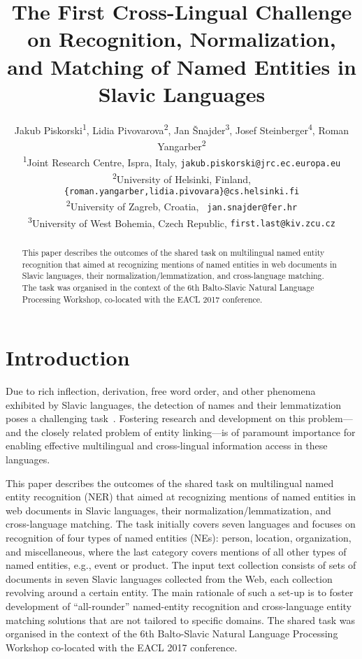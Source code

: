 \documentclass[11pt]{article}
\title{The First Cross-Lingual Challenge on Recognition,
  Normalization,  
  \\ and Matching of Named Entities in Slavic Languages}
\author{Jakub Piskorski\textsuperscript{1},
  Lidia Pivovarova\textsuperscript{2},
  Jan Šnajder\textsuperscript{3},
  Josef Steinberger\textsuperscript{4},
  Roman Yangarber\textsuperscript{2} \\
  \textsuperscript{1}Joint Research Centre,
  \comment{Via Enrico Fermi 2749, 21027}Ispra\comment{ (VA)}, Italy,
  {\small \tt jakub.piskorski@jrc.ec.europa.eu} \\
  \textsuperscript{2}University of Helsinki, Finland, {\small \tt
  \{roman.yangarber,lidia.pivovara\}@cs.helsinki.fi}\\
    \textsuperscript{2}University of Zagreb, Croatia, {\small \tt
    jan.snajder@fer.hr} \\
  \textsuperscript{3}University of West Bohemia, Czech Republic, 
  {\small \tt first.last@kiv.zcu.cz} 
  }
\date{}
\begin{document}
\maketitle
\begin{abstract}
This paper describes the outcomes of the shared task on multilingual named entity recognition 
that aimed at recognizing mentions of named entities in web documents in Slavic languages, 
their normalization/lemmatization, and cross-language matching. The task was organised in 
the context of the 6th Balto-Slavic Natural Language Processing Workshop, co-located with the 
EACL 2017 conference. 
\end{abstract}

\section{Introduction}
\label{sec:intro}

Due to rich inflection, derivation, free word order, and other phenomena
exhibited by Slavic languages, the detection of names and their
lemmatization poses a challenging
task~\cite{Przepiorkowski:2007:SIE:1567545.1567547,journals/ir/PiskorskiWS09}.
Fostering research and development on this problem---and the closely
related problem of entity linking---is of paramount importance for
enabling effective multilingual and cross-lingual information access in
these languages.

This paper describes the outcomes of the shared task on multilingual
named entity recognition {(NER)} that aimed at recognizing mentions
of named entities in web documents in Slavic languages, their
normalization/lemmatization, and cross-language matching.  The task
initially covers seven languages and focuses on recognition of four types
of named entities (NEs): person, location, organization, and
miscellaneous, where the last category covers mentions of all other types
of named entities, e.g., event or product.  The input text collection
consists of sets of documents in {seven Slavic languages} collected from
the Web, each collection revolving around a certain entity. The main
rationale of such a set-up is to foster development of ``all-rounder''
named-entity recognition and cross-language entity matching solutions
that are not tailored to specific domains.  The shared task was organised
in the context of the 6th Balto-Slavic Natural Language Processing
Workshop co-located with the EACL 2017 conference.
\end{document}
